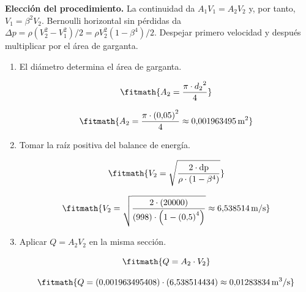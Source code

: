 \noindent\textbf{Elección del procedimiento.} La continuidad da $A_1V_1=A_2V_2$ y, por tanto, $V_1=\beta^2V_2$. Bernoulli horizontal sin pérdidas da $\Delta p=\rho(V_2^2-V_1^2)/2=\rho V_2^2(1-\beta^4)/2$. Despejar primero velocidad y después multiplicar por el área de garganta.

\begin{enumerate}

\item El diámetro determina el área de garganta.

\[\fitmath{A_{2}=\frac{\pi\cdot {d_{2}}^{2}}{4}}\]

\[\fitmath{A_{2}=\frac{\pi\cdot {(0{,}05)}^{2}}{4}\approx 0{,}001963495\,\mathrm{m^{2}}}\]

\item Tomar la raíz positiva del balance de energía.

\[\fitmath{V_{2}=\sqrt{\frac{2\cdot \mathrm{dp}}{\rho\cdot \left(1-{\beta}^{4}\right)}}}\]

\[\fitmath{V_{2}=\sqrt{\frac{2\cdot (20000)}{(998)\cdot \left(1-{(0{,}5)}^{4}\right)}}\approx 6{,}538514\,\mathrm{m/s}}\]

\item Aplicar $Q=A_2V_2$ en la misma sección.

\[\fitmath{Q=A_{2}\cdot V_{2}}\]

\[\fitmath{Q=(0{,}001963495408)\cdot (6{,}538514434)\approx 0{,}01283834\,\mathrm{m^{3}/s}}\]

\end{enumerate}
